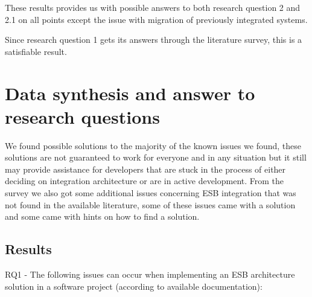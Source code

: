 \documentclass{llncs}
\begin{document}
These results provides us with possible answers to both research question 2 and 2.1 on all points except the issue with migration of previously integrated systems.

Since research question 1 gets its answers through the literature survey, this is a satisfiable result.

\section{Data synthesis and answer to research questions}
We found possible solutions to the majority of the known issues we found, these solutions are not guaranteed to work for everyone and in any situation but it still may provide assistance for developers that are stuck in the process of either deciding on integration architecture or are in active development.
From the survey we also got some additional issues concerning ESB integration that was not found in the available literature, some of these issues came with a solution and some came with hints on how to find a solution.

\subsection{Results}
RQ1 - The following issues can occur when implementing an ESB architecture solution in a software project (according to available documentation):
\end{document}
